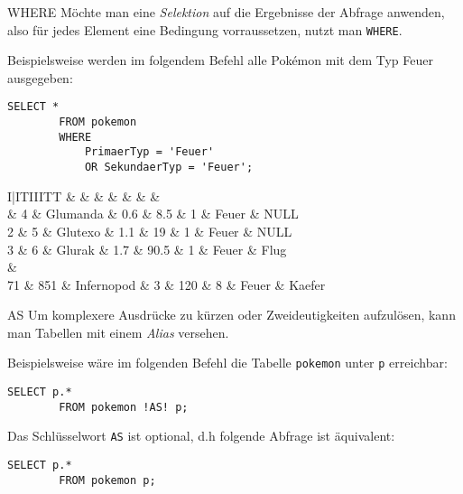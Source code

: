 \begin{sql}{WHERE}
    Möchte man eine \emph{Selektion} auf die Ergebnisse der Abfrage anwenden, also für jedes Element eine Bedingung vorraussetzen, nutzt man \texttt{WHERE}.

    Beispielsweise werden im folgendem Befehl alle Pokémon mit dem Typ Feuer ausgegeben:

    \begin{lstlisting}[language=mysql]
        SELECT *
        FROM pokemon
        WHERE
            PrimaerTyp = 'Feuer'
            OR SekundaerTyp = 'Feuer';
    \end{lstlisting}

    \setcounter{rownum}{0}
    \begin{tabular}{I|ITIIITT}
        &  &  &  &  &  &  &  \\ & 4 & Glumanda & 0.6 & 8.5 & 1 & Feuer & NULL \\
        2 & 5 & Glutexo & 1.1 & 19 & 1 & Feuer & NULL \\
        3 & 6 & Glurak & 1.7 & 90.5 & 1 & Feuer & Flug \\
         &  \\
        71 & 851 & Infernopod & 3 & 120 & 8 & Feuer & Kaefer \\
    \end{tabular}
\end{sql}

\begin{sql}{AS}
    Um komplexere Ausdrücke zu kürzen oder Zweideutigkeiten aufzulösen, kann man Tabellen mit einem \emph{Alias} versehen.

    Beispielsweise wäre im folgenden Befehl die Tabelle \texttt{pokemon} unter \texttt{p} erreichbar:

    \begin{lstlisting}[language=mysql]
        SELECT p.*
        FROM pokemon !AS! p;
    \end{lstlisting}

    Das Schlüsselwort \texttt{AS} ist optional, d.h folgende Abfrage ist äquivalent:
    
    \begin{lstlisting}[language=mysql]
        SELECT p.*
        FROM pokemon p;
    \end{lstlisting}
\end{sql}

